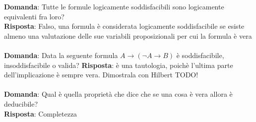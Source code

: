 \documentclass{article}
\begin{document}
\textbf{Domanda}: Tutte le formule logicamente soddisfacibili sono logicamente equivalenti fra loro? \\
\textbf{Risposta}: Falso, una formula è considerata logicamente soddisfacibile se esiste almeno una valutazione delle sue variabili proposizionali per cui la formula è vera \\ \\
\textbf{Domanda}: Data la seguente formula $A \to (\lnot A \to B)$ è soddisfacibile, insoddisfacibile o valida?
\textbf{Risposta}: è una tautologia, poichè l'ultima parte dell'implicazione è sempre vera. Dimostrala con Hilbert TODO! \\ \\
\textbf{Domanda}: Qual è quella proprietà che dice che se una cosa è vera allora è deducibile? \\
\textbf{Risposta}: Completezza \\ \\
\end{document}
